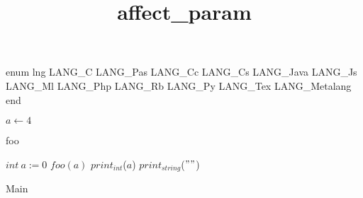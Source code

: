 \documentclass[8pt]{article}
\title{affect\_param}
\begin{document}
\maketitle
enum lng 
  LANG\_C
   LANG\_Pas
   LANG\_Cc
   LANG\_Cs
   LANG\_Java
   LANG\_Js
   LANG\_Ml
   LANG\_Php
   LANG\_Rb
   LANG\_Py
   LANG\_Tex
   LANG\_Metalang
end

\begin{algorithm}[H]

$a \leftarrow 4 $\;
\caption{foo}
\end{algorithm}

\begin{algorithm}[H]
$int\:a := 0$\;
$foo(a)$\;
$print_{int}$($ a $)\;
$print_{string}$($ "
" $)\;
\caption{Main}
\end{algorithm}
\end{document}
